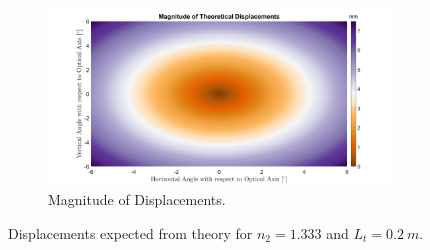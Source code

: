 \documentclass{article}
\begin{document}
\begin{figure}
\begin{subfigure}[b]{.5\linewidth}
\end{subfigure} \\
\begin{subfigure}[b]{\linewidth}
\centering \includegraphics[width=\linewidth]{magndispnmin.png}
\caption{Magnitude of Displacements.}\label{fig:1c}
\end{subfigure}%
\caption{Displacements expected from theory for $n_2 = 1.333$ and $L_t = \SI{0.2}{m}$.}\label{fig:1}
\end{figure}
\end{document}
